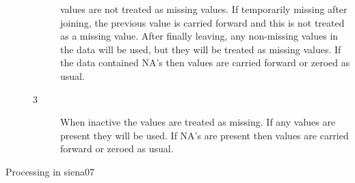 \documentclass[12pt,a4paper]{article}
\makeatletter
\renewcommand{\=}{\,=\,}
\newcommand{\+}{\,+\,}
\renewcommand{\section}{\@startsection{section}{1}
                {0pt}{\baselineskip}{0.5\baselineskip}
                {\centering\sffamily} }
\makeatother
\begin{document}
\begin{description}
\begin{description}
  values are not treated as missing values. If temporarily missing after
  joining, the previous value is carried forward and this is not treated as a
  missing value. After finally leaving, any non-missing values in the data will
  be used, but they will be treated as missing values. If the data contained
  NA's then values are carried forward or zeroed as usual.
\item[3] When inactive the values are treated as missing. If any values are
  present they will be used. If NA's are present then values are carried
  forward or zeroed as usual.
\end{description}
\end{description}

\section{Processing in siena07}
\end{document}
